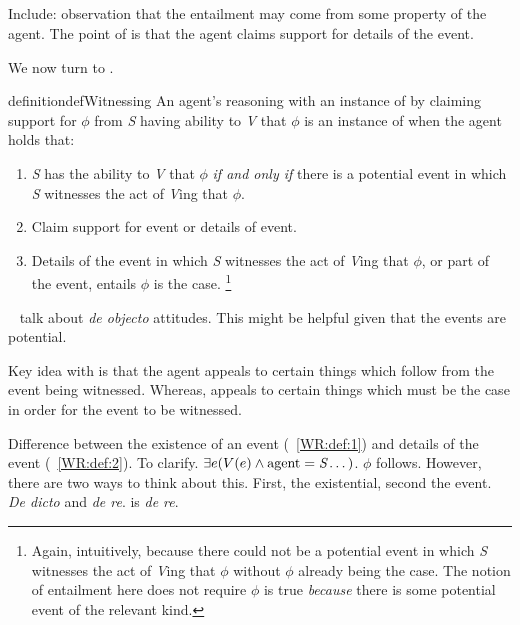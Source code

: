 \subsection{\WR{}}
\label{sec:wr-1}

\begin{note}[\WR{} def.]
  {
    \color{red}
    Include: observation that the entailment may come from some property of the agent.
    The point of \WR{} is that the agent claims support for details of the event.
  }

  We now turn to \WR{}.
  \begin{restatable}[\WR{}]{definition}{defWitnessing}\label{WR:def}
        An agent's reasoning with an instance of  by claiming support for \(\phi\) from \emph{S} having ability to \emph{V} that \(\phi\) is an instance of \emph{\WR{}} when the agent holds that:
    \begin{enumerate}
    \item\label{WR:def:1} \emph{S} has the ability to \emph{V} that \(\phi\) \emph{if and only if} there is a potential event in which \emph{S} witnesses the act of \emph{V}ing that \(\phi\).
    \item\label{WR:def:2} Claim support for event or details of event.
    \item\label{WR:def:3} Details of the event in which \emph{S} witnesses the act of \emph{V}ing that \(\phi\), or part of the event, entails \(\phi\) is the case.\nolinebreak
      \footnote{Again, intuitively, because there could not be a potential event in which \emph{S} witnesses the act of \emph{V}ing that \(\phi\) without \(\phi\) already being the case.
      The notion of entailment here does not require \(\phi\) is true \emph{because} there is some potential event of the relevant kind.}
    \end{enumerate}
  \end{restatable}

  {
    \color{red}
    ~\textcite{Rebuschi:2011ub} talk about \emph{de objecto} attitudes.
    This might be helpful given that the events are potential.
  }

  {
    \color{red}
    Key idea with \WR{} is that the agent appeals to certain things which follow from the event being witnessed.
    Whereas, \AR{} appeals to certain things which must be the case in order for the event to be witnessed.
  }

  {
    \color{red}
    Difference between the existence of an event (~\ref{WR:def:1}) and details of the event (~\ref{WR:def:2}).
    To clarify.
    \(\exists e(V(e) \land \text{agent} = \emph{S} \dots)\).
    \(\phi\) follows.
    However, there are two ways to think about this.
    First, the existential, second the event.
    \emph{De dicto} and \emph{de re}.
    \WR{} is \emph{de re}.

}
\end{note}

